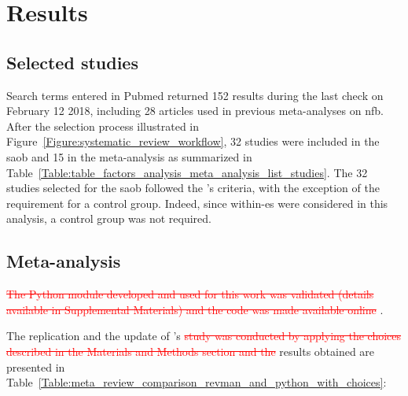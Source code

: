 


\section{Results}

\subsection{Selected studies}

Search terms entered in Pubmed returned 152 results during the last check on February 12 2018, including 28 
articles used in previous meta-analyses on \gls{nfb}. After the selection process illustrated 
in Figure~\ref{Figure:systematic_review_workflow}, 32 studies were included in the \gls{saob} and 15 in the meta-analysis 
as summarized in Table~\ref{Table:table_factors_analysis_meta_analysis_list_studies}. The 32 studies selected for the \gls{saob} 
followed the \citeauthor{Cortese2016}'s criteria, with the exception of the requirement for a control group. 
Indeed, since within-\gls{es} were considered in this analysis, a control group was not required.

\subsection{Meta-analysis}

\textcolor{red}{\sout{The Python module developed and used for this work was validated (details available in Supplemental Materials) 
and the code was made available online}} \citep{Bussalb2018}.

The replication and the update of \citeauthor{Cortese2016}'s \textcolor{red}{\sout{study was conducted by applying the choices described 
in the Materials and Methods section and the}} results obtained are presented 
in Table~\ref{Table:meta_review_comparison_revman_and_python_with_choices}:

